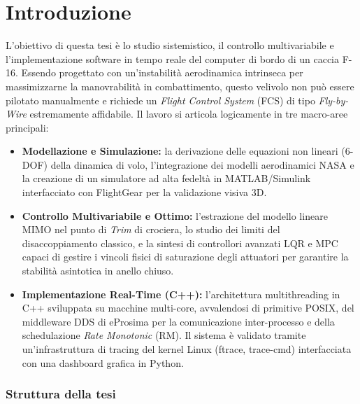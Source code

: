 \cleardoublepage
\chapter*{Introduzione}

L'obiettivo di questa tesi è lo studio sistemistico, il controllo multivariabile e l'implementazione software in tempo reale del computer di bordo di un caccia F-16. Essendo progettato con un'instabilità aerodinamica intrinseca per massimizzarne la manovrabilità in combattimento, questo velivolo non può essere pilotato manualmente e richiede un \textit{Flight Control System} (FCS) di tipo \textit{Fly-by-Wire} estremamente affidabile. Il lavoro si articola logicamente in tre macro-aree principali:
\begin{itemize}
	\item \textbf{Modellazione e Simulazione:} la derivazione delle equazioni non lineari (6-DOF) della dinamica di volo, l'integrazione dei modelli aerodinamici NASA e la creazione di un simulatore ad alta fedeltà in MATLAB/Simulink interfacciato con FlightGear per la validazione visiva 3D.
	\item \textbf{Controllo Multivariabile e Ottimo:} l'estrazione del modello lineare MIMO nel punto di \textit{Trim} di crociera, lo studio dei limiti del disaccoppiamento classico, e la sintesi di controllori avanzati LQR e MPC capaci di gestire i vincoli fisici di saturazione degli attuatori per garantire la stabilità asintotica in anello chiuso.
	\item \textbf{Implementazione Real-Time (C++):} l'architettura multithreading in C++ sviluppata su macchine multi-core, avvalendosi di primitive POSIX, del middleware DDS di eProsima per la comunicazione inter-processo e della schedulazione \textit{Rate Monotonic} (RM). Il sistema è validato tramite un'infrastruttura di tracing del kernel Linux (ftrace, trace-cmd) interfacciata con una dashboard grafica in Python.
\end{itemize}
\clearpage
\subsection*{Struttura della tesi}

